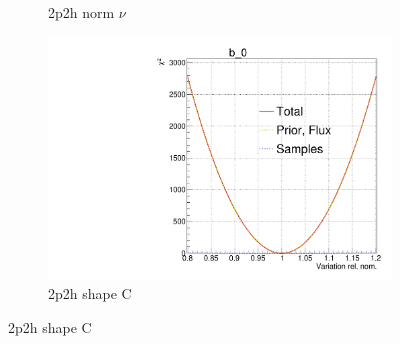 \begin{figure}[h]
\begin{subfigure}[t]{0.32\textwidth}
		\caption{2p2h norm $\nu$}
	\end{subfigure}
	\begin{subfigure}[t]{0.32\textwidth}
		\includegraphics[width=\textwidth,page=111, trim={0mm 0mm 0mm 11mm}, clip]{figures/mach3/2018/llh/tryBinningNumber6_after_fit_asimov_asimov_ND280logL_scan}
		\caption{2p2h shape C}
	\end{subfigure}


\end{figure}
